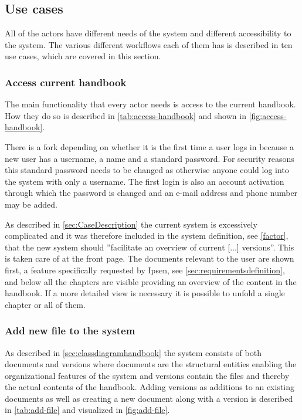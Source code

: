 \subsection{Use cases} \label{sec:usecases}
All of the actors have different needs of the system and different accessibility to the system. The various different workflows each of them has is described in ten use cases, which are covered in this section.

\subsubsection{Access current handbook}
The main functionality that every actor needs is access to the current handbook. How they do so is described in \cref{tab:access-handbook} and shown in \cref{fig:access-handbook}.




There is a fork depending on whether it is the first time a user logs in because a new user has a username, a name and a standard password.
For security reasons this standard password needs to be changed as otherwise anyone could log into the system with only a username.
The first login is also an account activation through which the password is changed and an e-mail address and phone number may be added.

As described in \cref{sec:CaseDescription} the current system is excessively complicated and it was therefore included in the system definition, see \cref{factor}, that the new system should ''facilitate an overview of current [...] versions''.
This is taken care of at the front page.
The documents relevant to the user are shown first, a feature specifically requested by Ipsen, see \cref{sec:requirementsdefinition}, and below all the chapters are visible providing an overview of the content in the handbook.
If a more detailed view is necessary it is possible to unfold a single chapter or all of them.


\subsubsection{Add new file to the system}
As described in \cref{sec:classdiagramhandbook} the system consists of both documents and versions where documents are the structural entities enabling the organizational features of the system and versions contain the files and thereby the actual contents of the handbook.
Adding versions as additions to an existing documents as well as creating a new document along with a version is described in \cref{tab:add-file} and visualized in \cref{fig:add-file}.

